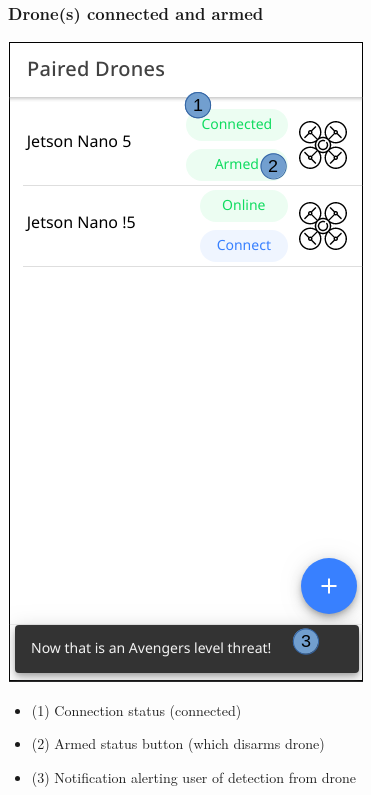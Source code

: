 \subsubsection{Drone(s) connected and armed}
\begin{minipage}[c]{0.5\linewidth}
	\centering
	\includegraphics[scale=0.4]{./assets/images/armed.png}
	\label{fig: mainPageArmed}
\end{minipage}
\begin{minipage}[c]{0.5\linewidth}
	\begin{itemize}
		\item (1) Connection status (connected)
		\item (2) Armed status button (which disarms drone)
		\item (3) Notification alerting user of detection from drone
	\end{itemize}
\end{minipage}

